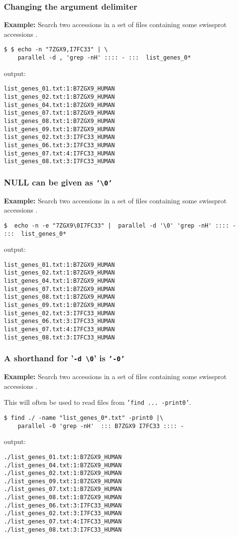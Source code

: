 \documentclass{article}
\newcommand{\example}[1]{
\textbf{Example: } {\color[rgb]{0,0,1} #1 } .
}
\newcommand{\cmdoption}[1]{\texttt{'#1'}}
\begin{document}
\subsubsection{Changing the argument delimiter}
\example{Search two accessions in a set of files containing some  swissprot accessions }
\begin{lstlisting}
$ $ echo -n "7ZGX9,I7FC33" | \
	parallel -d , 'grep -nH' :::: - :::  list_genes_0*
\end{lstlisting}
output:
\begin{lstlisting}
list_genes_01.txt:1:B7ZGX9_HUMAN
list_genes_02.txt:1:B7ZGX9_HUMAN
list_genes_04.txt:1:B7ZGX9_HUMAN
list_genes_07.txt:1:B7ZGX9_HUMAN
list_genes_08.txt:1:B7ZGX9_HUMAN
list_genes_09.txt:1:B7ZGX9_HUMAN
list_genes_02.txt:3:I7FC33_HUMAN
list_genes_06.txt:3:I7FC33_HUMAN
list_genes_07.txt:4:I7FC33_HUMAN
list_genes_08.txt:3:I7FC33_HUMAN
\end{lstlisting}

\subsubsection{NULL can be given as  \cmdoption{\textbackslash{}0}}
\example{Search two accessions in a set of files containing some swissprot accessions }
\begin{lstlisting}
$  echo -n -e "7ZGX9\0I7FC33" |  parallel -d '\0' 'grep -nH' :::: - :::  list_genes_0*
\end{lstlisting}
output:
\begin{lstlisting}
list_genes_01.txt:1:B7ZGX9_HUMAN
list_genes_02.txt:1:B7ZGX9_HUMAN
list_genes_04.txt:1:B7ZGX9_HUMAN
list_genes_07.txt:1:B7ZGX9_HUMAN
list_genes_08.txt:1:B7ZGX9_HUMAN
list_genes_09.txt:1:B7ZGX9_HUMAN
list_genes_02.txt:3:I7FC33_HUMAN
list_genes_06.txt:3:I7FC33_HUMAN
list_genes_07.txt:4:I7FC33_HUMAN
list_genes_08.txt:3:I7FC33_HUMAN
\end{lstlisting}

\subsubsection{A shorthand for '\texttt{-d  \textbackslash{}0}' is \cmdoption{-0} }

\example{Search two accessions in a set of files containing some  swissprot accessions }
This will often be used to read files from \cmdoption{find ... -print0}.
\begin{lstlisting}
$ find ./ -name "list_genes_0*.txt" -print0 |\
	parallel -0 'grep -nH'  ::: B7ZGX9 I7FC33 :::: -
\end{lstlisting}
output:
\begin{lstlisting}
./list_genes_01.txt:1:B7ZGX9_HUMAN
./list_genes_04.txt:1:B7ZGX9_HUMAN
./list_genes_02.txt:1:B7ZGX9_HUMAN
./list_genes_09.txt:1:B7ZGX9_HUMAN
./list_genes_07.txt:1:B7ZGX9_HUMAN
./list_genes_08.txt:1:B7ZGX9_HUMAN
./list_genes_06.txt:3:I7FC33_HUMAN
./list_genes_02.txt:3:I7FC33_HUMAN
./list_genes_07.txt:4:I7FC33_HUMAN
./list_genes_08.txt:3:I7FC33_HUMAN
\end{lstlisting}
\end{document}
